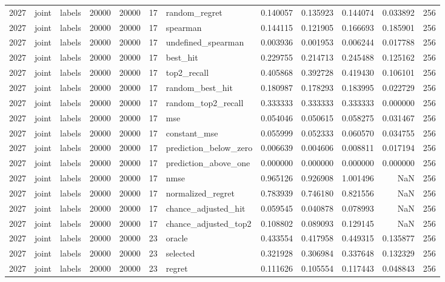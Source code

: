 \begin{tabular}{rllrrrlrrrrr}
2027 & joint & labels & 20000 & 20000 & 17 & random_regret & 0.140057 & 0.135923 & 0.144074 & 0.033892 & 256 \\
2027 & joint & labels & 20000 & 20000 & 17 & spearman & 0.144115 & 0.121905 & 0.166693 & 0.185901 & 256 \\
2027 & joint & labels & 20000 & 20000 & 17 & undefined_spearman & 0.003936 & 0.001953 & 0.006244 & 0.017788 & 256 \\
2027 & joint & labels & 20000 & 20000 & 17 & best_hit & 0.229755 & 0.214713 & 0.245488 & 0.125162 & 256 \\
2027 & joint & labels & 20000 & 20000 & 17 & top2_recall & 0.405868 & 0.392728 & 0.419430 & 0.106101 & 256 \\
2027 & joint & labels & 20000 & 20000 & 17 & random_best_hit & 0.180987 & 0.178293 & 0.183995 & 0.022729 & 256 \\
2027 & joint & labels & 20000 & 20000 & 17 & random_top2_recall & 0.333333 & 0.333333 & 0.333333 & 0.000000 & 256 \\
2027 & joint & labels & 20000 & 20000 & 17 & mse & 0.054046 & 0.050615 & 0.058275 & 0.031467 & 256 \\
2027 & joint & labels & 20000 & 20000 & 17 & constant_mse & 0.055999 & 0.052333 & 0.060570 & 0.034755 & 256 \\
2027 & joint & labels & 20000 & 20000 & 17 & prediction_below_zero & 0.006639 & 0.004606 & 0.008811 & 0.017194 & 256 \\
2027 & joint & labels & 20000 & 20000 & 17 & prediction_above_one & 0.000000 & 0.000000 & 0.000000 & 0.000000 & 256 \\
2027 & joint & labels & 20000 & 20000 & 17 & nmse & 0.965126 & 0.926908 & 1.001496 & NaN & 256 \\
2027 & joint & labels & 20000 & 20000 & 17 & normalized_regret & 0.783939 & 0.746180 & 0.821556 & NaN & 256 \\
2027 & joint & labels & 20000 & 20000 & 17 & chance_adjusted_hit & 0.059545 & 0.040878 & 0.078993 & NaN & 256 \\
2027 & joint & labels & 20000 & 20000 & 17 & chance_adjusted_top2 & 0.108802 & 0.089093 & 0.129145 & NaN & 256 \\
2027 & joint & labels & 20000 & 20000 & 23 & oracle & 0.433554 & 0.417958 & 0.449315 & 0.135877 & 256 \\
2027 & joint & labels & 20000 & 20000 & 23 & selected & 0.321928 & 0.306984 & 0.337648 & 0.132329 & 256 \\
2027 & joint & labels & 20000 & 20000 & 23 & regret & 0.111626 & 0.105554 & 0.117443 & 0.048843 & 256 \\

\end{tabular}

